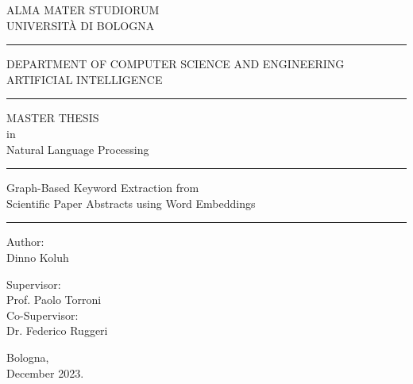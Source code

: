 \documentclass[12pt]{article}
\numberwithin{equation}{section}
\begin{document}
	
	\begin{titlepage}
		\begin{center}
			
			{\Large ALMA MATER STUDIORUM \\ UNIVERSIT\`A  DI BOLOGNA \\}
			\vspace{0.4cm} 
			\hrule
			\vspace{0.4cm} 
			{\Large DEPARTMENT OF COMPUTER SCIENCE AND ENGINEERING \\} 
			{\Large ARTIFICIAL INTELLIGENCE \\}
			\vspace{0.4cm} 
			\hrule
			\vspace{1cm}
			{\Large MASTER THESIS}\\[0.4cm]
			{\large in} \\[0.4cm]
			{\Large Natural Language Processing}\\[1cm]
			
			\hrule
			\vspace{0.4cm}
			
			{\Huge Graph-Based Keyword Extraction from}\\[0.3cm]
			{\Huge Scientific Paper Abstracts using Word Embeddings}
			\vspace{0.4cm}
			
			\hrule
			\vspace{2cm}
			
			{\large Author:}\\
			{\large Dinno Koluh\\}
			
			\vspace{2cm}
			
			{\large Supervisor:}\\[0.1cm]
			{\large Prof. Paolo Torroni}\\[0.4cm]
			
			{\large Co-Supervisor:}\\[0.1cm]
			{\large Dr. Federico Ruggeri}
			
			\vspace{2cm} 
			{\large Bologna,}\\[0.1cm] 
			{\large December 2023.}
			
		\end{center}
	\end{titlepage}
	\newpage
	\thispagestyle{empty}
	
\end{document}
